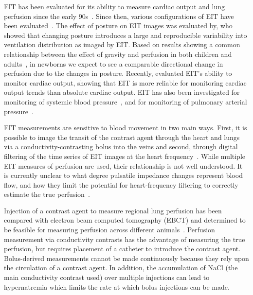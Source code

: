 EIT has been evaluated for its ability to measure cardiac output and
lung perfusion since the early 90s~\parencite{Eyuboglu1989,Blottt1992,Frerichs2002}. %
Since then, various configurations of EIT have been evaluated~\parencite{Borges2012,Nguyen2015}.
The effect of posture on EIT images
was evaluated by, who showed that changing posture
introduces a large and reproducible variability into ventilation distribution as imaged by EIT.
Based on results showing a common relationship between the effect of gravity and perfusion in both children and
adults~\parencite{Bhuyan1989},
in newborns we expect to see a comparable directional change in perfusion due to the changes in
posture.
Recently, evaluated EIT's ability to monitor
cardiac output, showing that EIT is more reliable for monitoring
cardiac output trends than absolute cardiac output.
EIT has also been investigated for
monitoring of systemic blood pressure~\parencite{Sola2011}, and 
for monitoring of pulmonary arterial pressure~\parencite{Proenca2017}.

EIT measurements are sensitive to blood movement in
two main ways. First, it is possible to image the transit of the
contrast agent through the heart and lungs via a conductivity-contrasting
bolus into the veins and second, through
digital filtering of the time series of EIT images at the heart
frequency~\parencite{Leathard1994}.
While multiple EIT measures of perfusion are used, their relationship is 
not well understood.
It is currently unclear to what degree pulsatile impedance changes
represent blood flow, and how
they limit the potential for heart-frequency filtering to correctly estimate
the true perfusion~\parencite{Nguyen2012}.

Injection of a contrast agent to measure regional lung perfusion has been compared with 
electron beam computed tomography (EBCT) and determined to be feasible 
for measuring perfusion across different animals~\parencite{Frerichs2002}.
Perfusion measurement via conductivity contrasts has the advantage of measuring the true perfusion,
but requires placement of a catheter to 
introduce the contrast agent.
Bolus-derived measurements cannot be made continuously because they rely
upon the circulation of a contrast agent. In addition, 
the accumulation of NaCl (the main conductivity contrast used)
over multiple injections
can lead to hypernatremia which limits the rate at which bolus
injections can be made.
 
